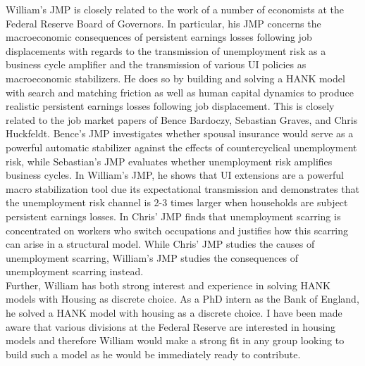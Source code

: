 \documentclass[\econtexRoot/Letter]{subfiles}
\begin{document}
\setcounter{page}{0}


William's JMP is closely related to the work of a number of economists at the Federal Reserve Board of Governors. In particular, his JMP concerns the macroeconomic consequences of persistent earnings losses following job displacements with regards to the transmission of unemployment risk as a business cycle amplifier and the transmission of various UI policies as macroeconomic stabilizers. He does so by building and solving a HANK model with search and matching friction as well as human capital dynamics to produce realistic persistent earnings losses following job displacement. This is closely related to the job market papers of Bence Bardoczy, Sebastian Graves, and Chris Huckfeldt. Bence's JMP investigates whether spousal insurance would serve as a powerful automatic stabilizer against the effects of countercyclical unemployment risk, while Sebastian's JMP evaluates whether unemployment risk amplifies business cycles. In William's JMP, he shows that UI extensions are a powerful macro stabilization tool due its expectational transmission and demonstrates that the unemployment risk channel is 2-3 times larger when households are subject persistent earnings losses. In Chris' JMP finds that unemployment scarring is concentrated on workers who switch occupations and justifies how this scarring can arise in a structural model. While Chris' JMP studies the causes of unemployment scarring, William's JMP studies the consequences of unemployment scarring instead.\\

Further, William has both strong interest and experience in solving HANK models with Housing as discrete choice. As a PhD intern as the Bank of England, he solved a HANK model with housing as a discrete choice. I have been made aware that various divisions at the Federal Reserve are interested in housing models and therefore William would make a strong fit in any group looking to build such a model as he would be immediately ready to contribute. \\
\end{document}
